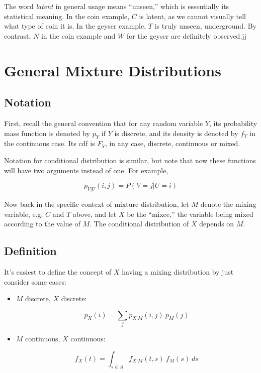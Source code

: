 The word \textit{latent} in general usage means ``unseen,'' which is
essentially its statistical meaning.  In the coin example, $C$ is
latent, as we cannot visually tell what type of coin it is.  In the
geyser example, $T$ is truly unseen, underground.  By contrast, $N$
in the coin example and $W$ for the geyser are definitely observed.jj

\section{General Mixture Distributions}
\label{genmix}

\subsection{Notation}

First, recall the general convention that for any random variable $Y$,
its probability mass function is denoted by $p_Y$ if $Y$ is discrete,
and its density is denoted by $f_Y$ in the continuous case.  Its cdf is
$F_Y$, in any case, discrete, continuous or mixed.

Notation for conditional distribution is similar, but note that now
these functions will have two arguments instead of one.  For example,

\begin{equation}
p_{V | U}(i,j) = P(V = j | U = i)
\end{equation}

Now back in the specific context of mixture distribution,
let $M$ denote the mixing variable, e.g. $C$ and $T$ above, and let $X$
be the ``mixee,'' the variable being mixed according to the value of
$M$.  The conditional distribution of $X$ depends on $M$.  

\subsection{Definition}

It's easiest to define the concept of $X$ having a mixing distribution 
by just consider some cases:

\begin{itemize}

\item $M$ discrete, $X$ discrete:  

\begin{equation}
\label{mdscxdisc}
p_X(i) = \sum_j p_{X|M} (i,j) ~ p_M(j)
\end{equation}

\item $M$ continuous, $X$ continuous:  

\begin{equation}
\label{mcontinxcontin}
f_X(t) = \int_{s \in A} f_{X|M}(t,s) ~  f_M(s) ~ ds
\end{equation}

\end{itemize}

